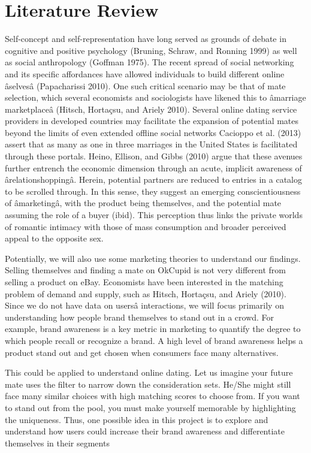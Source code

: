 \documentclass[]{article}
\begin{document}
\hypertarget{literature-review}{%
\section{Literature Review}\label{literature-review}}

Self-concept and self-representation have long served as grounds of
debate in cognitive and positive psychology (Bruning, Schraw, and
Ronning 1999) as well as social anthropology (Goffman 1975). The recent
spread of social networking and its specific affordances have allowed
individuals to build different online âselvesâ (Papacharissi 2010).
One such critical scenario may be that of mate selection, which several
economists and sociologists have likened this to âmarriage
marketplaceâ (Hitsch, Hortaçsu, and Ariely 2010). Several online
dating service providers in developed countries may facilitate the
expansion of potential mates beyond the limits of even extended offline
social networks Cacioppo et al. (2013) assert that as many as one in
three marriages in the United States is facilitated through these
portals. Heino, Ellison, and Gibbs (2010) argue that these avenues
further entrench the economic dimension through an acute, implicit
awareness of ârelationshoppingâ. Herein, potential partners are
reduced to entries in a catalog to be scrolled through. In this sense,
they suggest an emerging conscientiousness of âmarketingâ, with the
product being themselves, and the potential mate assuming the role of a
buyer (ibid). This perception thus links the private worlds of romantic
intimacy with those of mass consumption and broader perceived appeal to
the opposite sex.

Potentially, we will also use some marketing theories to understand our
findings. Selling themselves and finding a mate on OkCupid is not very
different from selling a product on eBay. Economists have been
interested in the matching problem of demand and supply, such as Hitsch,
Hortaçsu, and Ariely (2010). Since we do not have data on usersâ
interactions, we will focus primarily on understanding how people brand
themselves to stand out in a crowd. For example, brand awareness is a
key metric in marketing to quantify the degree to which people recall or
recognize a brand. A high level of brand awareness helps a product stand
out and get chosen when consumers face many alternatives.

This could be applied to understand online dating. Let us imagine your
future mate uses the filter to narrow down the consideration sets.
He/She might still face many similar choices with high matching scores
to choose from. If you want to stand out from the pool, you must make
yourself memorable by highlighting the uniqueness. Thus, one possible
idea in this project is to explore and understand how users could
increase their brand awareness and differentiate themselves in their
segments
\end{document}
